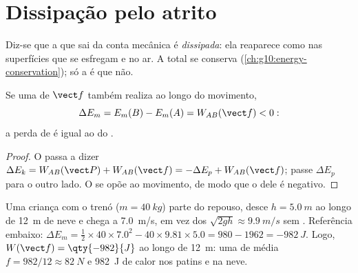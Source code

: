 \section{Dissipação pelo atrito}

\begin{definition}[Dissipação]\label{def:g11:mechanical-energy:dissipation}
Diz-se que a  que sai da conta mecânica é
\emph{dissipada}: ela reaparece como 
nas superfícies que se esfregam e no ar. A  total se conserva
(\cref{ch:g10:energy-conservation}); só a  é que não.
\end{definition}

\begin{proposition}\label{prop:g11:mechanical-energy:deficit}
Se uma  de  $\vect f$ também realiza  ao longo do
movimento,
\[
\Delta E_m = E_m(B) - E_m(A) = W_{AB}(\vect f) < 0:
\]
a perda de  é igual ao  do .
\end{proposition}

\begin{proof}
O  passa a dizer
$\Delta E_k = W_{AB}(\vect P) + W_{AB}(\vect f) = -\Delta E_p +
W_{AB}(\vect f)$; passe $\Delta E_p$ para o outro lado. O  se opõe
ao movimento, de modo que o  dele é negativo.
\end{proof}

\begin{example}\label{ex:g11:mechanical-energy:toboggan}
Uma criança com o trenó ($m = \qty{40}{kg}$) parte do repouso, desce
$h = \qty{5.0}{m}$ ao longo de \qty{12}{m} de neve e chega a
\qty{7.0}{m/s}, em vez dos $\sqrt{2gh} \approx \qty{9.9}{m/s}$ sem
. Referência embaixo:
$\Delta E_m = \tfrac12 \times 40 \times 7.0^2 - 40 \times 9.81
\times 5.0 = 980 - 1962 = \qty{-982}{J}$. Logo,
$W(\vect f) = \qty{-982}{J}$ ao longo de \qty{12}{m}: uma  de
 média $f = 982/12 \approx \qty{82}{N}$ e \qty{982}{J} de calor
nos patins e na neve.
\end{example}

